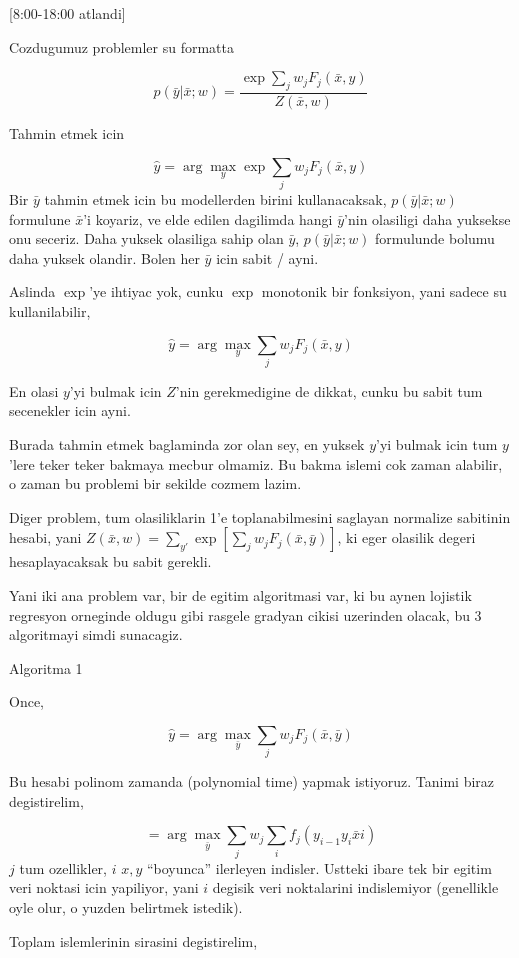\documentclass[12pt,fleqn]{article}\usepackage{../common}
\begin{document}
[8:00-18:00 atlandi]

Cozdugumuz problemler su formatta

$$ p(\bar{y}|\bar{x};w) = \frac{\exp \sum_j w_j F_j (\bar{x},y)}{Z(\bar{x},w)} $$


Tahmin etmek icin 

$$ \hat{y} = \arg\max_{y}  \exp \sum_j w_j F_j(\bar{x},y)$$
Bir $\bar{y}$ tahmin etmek icin bu modellerden birini kullanacaksak, $
p(\bar{y}|\bar{x};w)$ 
formulune $\bar{x}$'i koyariz, ve elde edilen dagilimda hangi $\bar{y}$'nin
olasiligi  daha yuksekse onu seceriz. Daha yuksek olasiliga sahip olan 
$\bar{y}$, $p(\bar{y}|\bar{x};w)$ formulunde bolumu daha yuksek olandir. Bolen her $\bar{y}$ 
icin sabit / ayni.

Aslinda $\exp$'ye ihtiyac yok, cunku $\exp$ monotonik bir fonksiyon, yani
sadece su kullanilabilir,

$$ \hat{y} = \arg\max_{y}  \sum_j w_j F_j(\bar{x},y)$$

En olasi $y$'yi bulmak icin $Z$'nin gerekmedigine de dikkat, cunku bu sabit
tum secenekler icin ayni.

Burada tahmin etmek baglaminda zor olan sey, en yuksek $y$'yi bulmak
icin tum $y$'lere teker teker bakmaya mecbur olmamiz. Bu bakma islemi
cok zaman alabilir, o zaman bu problemi bir sekilde cozmem lazim. 

Diger problem, tum olasiliklarin 1'e toplanabilmesini saglayan normalize
sabitinin hesabi, yani $Z(\bar{x},w) = \sum_{y'}\exp [ \sum_j w_j F_j(\bar{x},\bar{y})
]$, ki eger olasilik 
degeri hesaplayacaksak bu sabit gerekli. 

Yani iki ana problem var, bir de egitim algoritmasi var, ki bu aynen
lojistik regresyon orneginde oldugu gibi rasgele gradyan cikisi uzerinden
olacak, bu 3 algoritmayi simdi sunacagiz. 

Algoritma 1

Once,

$$ \hat{y} = \arg\max_{\bar{y}}  \sum_j w_j F_j(\bar{x},\bar{y})$$

Bu hesabi polinom zamanda (polynomial time) yapmak istiyoruz. Tanimi biraz
degistirelim, 

$$ = \arg\max_{\bar{y}}  \sum_j w_j \sum_i f_j(y_{i-1}y_i \bar{x} i )$$
$j$ tum ozellikler, $i$ $x,y$ ``boyunca'' ilerleyen indisler. Ustteki ibare
tek bir egitim veri noktasi icin yapiliyor, yani $i$ degisik veri
noktalarini indislemiyor (genellikle oyle olur, o yuzden belirtmek
istedik). 

Toplam islemlerinin sirasini degistirelim, 
\end{document}
